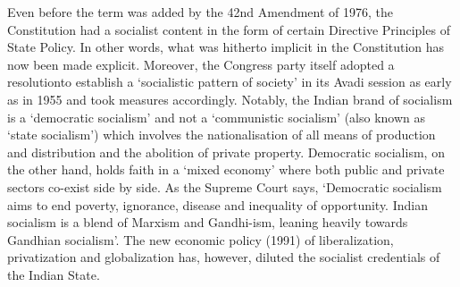 Even before the term was added by the 42nd Amendment of 1976, the Constitution had a socialist content in the form of certain Directive Principles of State Policy. In other words, what was hitherto implicit in the Constitution has now been made explicit. Moreover, the Congress party itself adopted a resolution\endnote to establish a `socialistic pattern of society' in its Avadi session as early as in 1955 and took measures accordingly. Notably, the Indian brand of socialism is a `democratic socialism' and not a `communistic socialism' (also known as `state socialism') which involves the nationalisation of all means of production and distribution and the abolition of private property. Democratic socialism, on the other hand, holds faith in a `mixed economy' where both public and private sectors co-exist side by side\endnote. As the Supreme Court says, `Democratic socialism aims to end poverty, ignorance, disease and inequality of opportunity\endnote. Indian socialism is a blend of Marxism and Gandhi-ism, leaning heavily towards Gandhian socialism'. The new economic policy (1991) of liberalization, privatization and globalization has, however, diluted the socialist credentials of the Indian State.


\theendnotes
\cleardoublepage